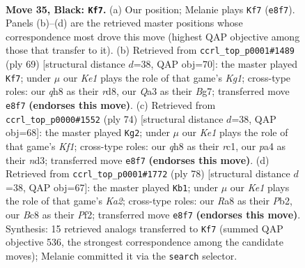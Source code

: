 \documentclass[11pt]{article}
\begin{document}
\clearpage

\begin{figure}[p]\centering
\begin{subfigure}{0.46\textwidth}\centering
\resizebox{\linewidth}{!}{%
\newchessgame
\chessboard[
  setfen={r1b1k2Q/8/2p1p3/p3P3/P4P2/q7/4K3/6N1 b - - 3 35},
  showmover=false,
  pgfstyle=straightmove, color=movearrow, markmove={e8-f7}
]}
\caption{}
\end{subfigure}\hfill
\begin{subfigure}{0.46\textwidth}\centering
\resizebox{\linewidth}{!}{%
\newchessgame
\chessboard[
  setfen={3R2k1/6b1/p3p1pp/8/P4P2/2N4P/4K1P1/r7 b - - 8 35},
  showmover=false,
  pgfstyle=straightmove, color=movearrow, markmove={g8-f7}
]}
\caption{}
\end{subfigure}
\\[4pt]
\begin{subfigure}{0.46\textwidth}\centering
\resizebox{\linewidth}{!}{%
\newchessgame
\chessboard[
  setfen={8/2k3p1/B3p2p/PR2P3/8/3n2P1/7P/2r2K2 w - - 3 38},
  showmover=false,
  pgfstyle=straightmove, color=movearrow, markmove={f1-g2}
]}
\caption{}
\end{subfigure}\hfill
\begin{subfigure}{0.46\textwidth}\centering
\resizebox{\linewidth}{!}{%
\newchessgame
\chessboard[
  setfen={8/1p6/p6Q/q2k2p1/6P1/7P/KP3P2/8 w - - 3 40},
  showmover=false,
  pgfstyle=straightmove, color=movearrow, markmove={a2-b1}
]}
\caption{}
\end{subfigure}
\caption{\textbf{Move 35, Black: \texttt{Kf7}.} (a) Our position; Melanie plays \texttt{Kf7} (\texttt{e8f7}). Panels (b)--(d) are the retrieved master positions whose correspondence most drove this move (highest QAP objective among those that transfer to it). (b) Retrieved from \texttt{ccrl\_top\_p0001\#1489} (ply 69) [structural distance $d$=38, QAP obj=70]: the master played \texttt{Kf7}; under $\mu$ our \emph{Ke1} plays the role of that game's \emph{Kg1}; cross-type roles: our \emph{q}h8 as their \emph{r}d8, our \emph{Q}a3 as their \emph{B}g7; transferred move \texttt{e8f7} \textbf{(endorses this move)}. (c) Retrieved from \texttt{ccrl\_top\_p0000\#1552} (ply 74) [structural distance $d$=38, QAP obj=68]: the master played \texttt{Kg2}; under $\mu$ our \emph{Ke1} plays the role of that game's \emph{Kf1}; cross-type roles: our \emph{q}h8 as their \emph{r}c1, our \emph{p}a4 as their \emph{n}d3; transferred move \texttt{e8f7} \textbf{(endorses this move)}. (d) Retrieved from \texttt{ccrl\_top\_p0001\#1772} (ply 78) [structural distance $d$=38, QAP obj=67]: the master played \texttt{Kb1}; under $\mu$ our \emph{Ke1} plays the role of that game's \emph{Ka2}; cross-type roles: our \emph{R}a8 as their \emph{P}b2, our \emph{B}c8 as their \emph{P}f2; transferred move \texttt{e8f7} \textbf{(endorses this move)}. Synthesis: 15 retrieved analogs transferred to \texttt{Kf7} (summed QAP objective 536, the strongest correspondence among the candidate moves); Melanie committed it via the \texttt{search} selector.}
\label{fig:thought-m69}
\end{figure}
\end{document}
